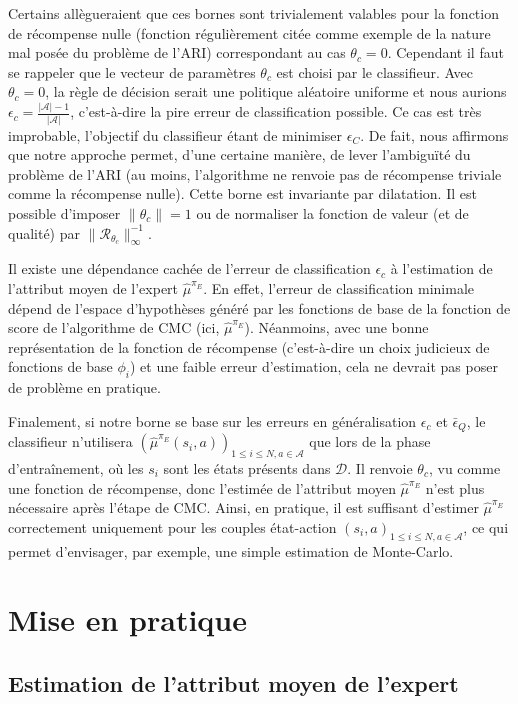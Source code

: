 \documentclass[french,utf8]{./hermes-journal}
\newcommand{\R}{\mathcal{R}}
\newcommand{\A}{\mathcal{A}}
\newcommand{\D}{\mathcal{D}}
\begin{document}
Certains allègueraient que ces bornes sont trivialement valables pour la fonction de récompense nulle (fonction régulièrement citée comme exemple de la nature mal posée du problème de l'ARI) correspondant au cas $\theta_c=0$. Cependant il faut se rappeler que le vecteur de paramètres $\theta_c$ est choisi par le classifieur. Avec 
$\theta_c=0$, la règle de décision serait une politique aléatoire uniforme et nous aurions $\epsilon_c = \frac{|\A|-1}{|\A|}$, c'est-à-dire la pire erreur de classification possible. Ce cas est très improbable, l'objectif du classifieur étant de minimiser $\epsilon_C$. De fait, nous affirmons que notre approche permet, d'une certaine manière, de lever l'ambiguïté du problème de l'ARI (au moins, l'algorithme ne renvoie pas de récompense triviale comme la récompense nulle).
%
Cette borne est invariante par dilatation. Il est possible d'imposer 
$\|\theta_c\|=1$ ou de normaliser la fonction de valeur (et de qualité) par 
$\|\R_{\theta_c}\|_\infty^{-1}$.

Il existe une dépendance cachée de l'erreur de classification  $\epsilon_c$ à l'estimation de l'attribut moyen de l'expert  $\hat{\mu}^{\pi_E}$. En effet, l'erreur de classification minimale dépend de l'espace d'hypothèses généré par les fonctions de base de la fonction de score de l'algorithme de CMC (ici, 
$\hat{\mu}^{\pi_E}$). Néanmoins, avec une bonne représentation de la fonction de récompense (c'est-à-dire un choix judicieux de fonctions de base $\phi_i$) et une faible erreur d'estimation, cela ne devrait pas poser de problème en pratique.

Finalement, si notre borne se base sur les erreurs en généralisation 
$\epsilon_c$ et $\bar{\epsilon}_Q$, le classifieur n'utilisera 
$(\hat{\mu}^{\pi_E}(s_i,a))_{1\leq i\leq N,a\in\A}$ que lors de la phase d'entraînement, où les $s_i$ sont les états présents dans $\D$. Il renvoie 
$\theta_c$, vu comme une fonction de récompense, donc l'estimée de l'attribut moyen $\hat{\mu}^{\pi_E}$ n'est plus nécessaire après l'étape de CMC. Ainsi, en pratique, il est suffisant d'estimer 
$\hat{\mu}^{\pi_E}$ correctement uniquement pour les couples état-action $(s_i,a)_{1\leq i\leq
N,a\in\A}$, ce qui permet d'envisager, par exemple, une simple estimation de Monte-Carlo.

\section{Mise en pratique}
\label{seracticalApproach}

\subsection{Estimation de l'attribut moyen de l'expert}
\label{subseracticalApproacuE}
\end{document}
